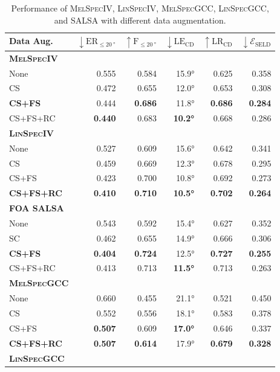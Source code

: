 \documentclass[journal]{IEEEtran}
\begin{document}
\begin{table}[t]
    \setlength\tabcolsep{3pt}
    \centering
    \caption{Performance of \textsc{MelSpecIV}, \textsc{LinSpecIV}, \textsc{MelSpecGCC}, \textsc{LinSpecGCC}, and SALSA with different data augmentation.}
    \noindent\begin{tabularx}{\columnwidth}{Xrrrrr}
    \toprule 
        Data Aug. 
        & $\downarrow \text{ER}_{\le \SI{20}{\degree}}$ 
        & $\uparrow \text{F}_{\le \SI{20}{\degree}}$
        & $\downarrow \text{LE}_\text{CD}$
        & $\uparrow \text{LR}_\text{CD}$ 
        & $\downarrow \mathcal{E}_\text{SELD}$ \\
    \midrule
    \bfseries \textsc{MelSpecIV}\\
        None        & 0.555 & 0.584 & 15.9\si{\degree} & 0.625 & 0.358 \\
        CS          & 0.472 & 0.655 & 12.0\si{\degree} & 0.653 & 0.308 \\
        \bf{CS+FS}  & 0.444 & \bf{0.686} & 11.8\si{\degree} & \bf{0.686} & \bf{0.284} \\
        CS+FS+RC    & \bf{0.440} & 0.683 & \bf{10.2\si{\degree}} & 0.668 & 0.286 \\
    \midrule
    \bfseries \textsc{LinSpecIV}\\
        None            & 0.527 & 0.609 & 15.6\si{\degree} & 0.642 & 0.341 \\
        CS              & 0.459 & 0.669 & 12.3\si{\degree} & 0.678 & 0.295 \\
        CS+FS           & 0.423 & 0.700 & 10.8\si{\degree} & 0.692 & 0.273 \\
        \bf{CS+FS+RC}   & \bf{0.410} & \bf{0.710} & \bf{10.5\si{\degree}} & \bf{0.702} & \bf{0.264} \\
    \midrule
    \bfseries FOA SALSA\\
    
        None            & 0.543 & 0.592 & 15.4\si{\degree} & 0.627 & 0.352 \\
        SC              & 0.462 & 0.655 & 14.9\si{\degree} & 0.666 & 0.306 \\
        \bf{CS+FS}      & \bf{0.404} & \bf{0.724} & 12.5\si{\degree} & \bf{0.727} & \bf{0.255} \\
        CS+FS+RC        & 0.413 & 0.713 & \bf{11.5\si{\degree}} & 0.713 & 0.263 \\
    \midrule\midrule
    \bfseries \textsc{MelSpecGCC}\\
    
        None            & 0.660 & 0.455 & 21.1\si{\degree} & 0.521 & 0.450 \\
        CS              & 0.552 & 0.556 & 18.1\si{\degree} & 0.583 & 0.378 \\
        CS+FS           & \bf{0.507} & 0.609 & \bf{17.0\si{\degree}} & 0.646 & 0.337 \\
        \bf{CS+FS+RC}   & \bf{0.507} & \bf{0.614} & 17.9\si{\degree} & \bf{0.679} & \bf{0.328} \\
    \midrule
    \bfseries \textsc{LinSpecGCC}\\
    

\end{tabularx}
\end{table}
\end{document}
